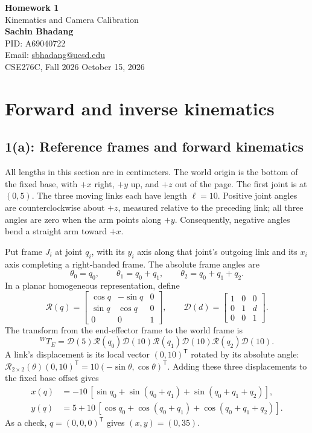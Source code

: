 \documentclass[10pt,letterpaper]{article}
\newcommand{\T}{^{\mathsf T}}
\begin{document}
\begin{center}
{\LARGE\bfseries Homework 1}\\[5pt]
{\Large Kinematics and Camera Calibration}\\[5pt]
\textbf{Sachin Bhadang}\\
PID: A69040722\\
Email: \href{mailto:sbhadang@ucsd.edu}{sbhadang@ucsd.edu}\\[5pt]
CSE276C, Fall 2026 \hfill October 15, 2026
\end{center}

\section{Forward and inverse kinematics}
\subsection*{1(a): Reference frames and forward kinematics}
All lengths in this section are in centimeters. The world origin is the bottom
of the fixed base, with $+x$ right, $+y$ up, and $+z$ out of the page. The first
joint is at $(0,5)$. The three moving links each have length $\ell=10$.
Positive joint angles are counterclockwise about $+z$, measured relative to the
preceding link; all three angles are zero when the arm points along $+y$.
Consequently, negative angles bend a straight arm toward $+x$.

Put frame $J_i$ at joint $q_i$, with its $y_i$ axis along that joint's outgoing
link and its $x_i$ axis completing a right-handed frame. The absolute frame angles are
\[
\theta_0=q_0,\qquad \theta_1=q_0+q_1,\qquad
\theta_2=q_0+q_1+q_2.
\]
In a planar homogeneous representation, define
\[
\mathcal R(q)=\begin{bmatrix}\cos q&-\sin q&0\\
\sin q&\cos q&0\\0&0&1\end{bmatrix},\qquad
\mathcal D(d)=\begin{bmatrix}1&0&0\\0&1&d\\0&0&1\end{bmatrix}.
\]
The transform from the end-effector frame to the world frame is
\[
{}^WT_E=\mathcal D(5)\mathcal R(q_0)\mathcal D(10)
\mathcal R(q_1)\mathcal D(10)\mathcal R(q_2)\mathcal D(10).
\]
A link's displacement is its local vector $(0,10)\T$ rotated by its absolute
angle: $\mathcal R_{2\times2}(\theta)(0,10)\T
=10(-\sin\theta,\cos\theta)\T$. Adding these three displacements to the
fixed base offset gives
\begin{equation}
\boxed{\begin{aligned}
x(q)&=-10\,[\sin q_0+\sin(q_0+q_1)+\sin(q_0+q_1+q_2)],\\
y(q)&=5+10\,[\cos q_0+\cos(q_0+q_1)+\cos(q_0+q_1+q_2)].
\end{aligned}}
\end{equation}
As a check, $q=(0,0,0)\T$ gives $(x,y)=(0,35)$.
\end{document}
